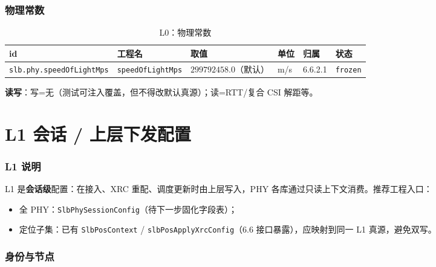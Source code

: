 \documentclass[11pt,a4paper]{ctexart}
\begin{document}
\section{物理常数}

\begin{longtable}{L{3.8cm}L{3.2cm}L{3.5cm}L{1.6cm}L{1.6cm}L{1.6cm}}
\caption{L0：物理常数\label{tab:l0-phys}} \\
\toprule
\textbf{id} & \textbf{工程名} & \textbf{取值} & \textbf{单位} & \textbf{归属} & \textbf{状态} \\
\midrule
\texttt{slb.phy.speedOfLightMps} &
\texttt{speedOfLightMps} &
$299792458.0$（默认） &
m/s &
6.6.2.1 &
\texttt{frozen} \\
\end{longtable}

\noindent\textbf{读写}：写=无（测试可注入覆盖，但不得改默认真源）；读=RTT/复合 CSI 解距等。

\newpage
\part{L1 会话 / 上层下发配置}

\section{L1 说明}

L1 是\textbf{会话级}配置：在接入、XRC 重配、调度更新时由上层写入，PHY 各库通过只读上下文消费。推荐工程入口：

\begin{itemize}[nosep]
  \item 全 PHY：\texttt{SlbPhySessionConfig}（待下一步固化字段表）；
  \item 定位子集：已有 \texttt{SlbPosContext} / \texttt{slbPosApplyXrcConfig}（6.6 接口暴露），应映射到同一 L1 真源，避免双写。
\end{itemize}

\section{身份与节点}
\end{document}
